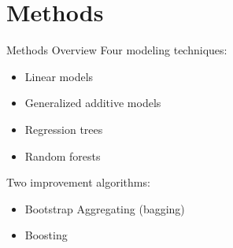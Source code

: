 \documentclass{beamer}
\begin{document}
	
	\section{Methods}
	
	\begin{frame}{Methods Overview}
		Four modeling techniques:
		\begin{itemize}
			\item Linear models
			\item Generalized additive models
			\item Regression trees
			\item Random forests
		\end{itemize}
		Two improvement algorithms:
		\begin{itemize}
			\item Bootstrap Aggregating (bagging)
			\item Boosting
		\end{itemize}
	\end{frame}
\end{document}
